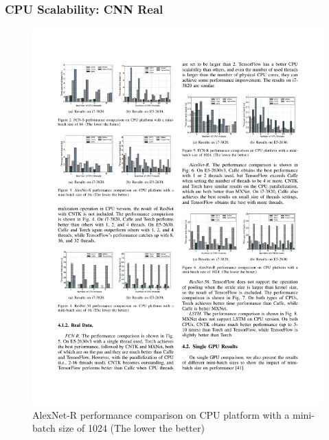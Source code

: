 \begin{frame}
	\MyLogo
	\frametitle{CPU Scalability: CNN Real}  
	\begin{figure}[htbp] 
		\includegraphics[width=\linewidth]{figures/AlexNet-R1.pdf} 
		\caption{AlexNet-R performance comparison on CPU platform with a mini-batch size of 1024 (The lower the better)}
	\end{figure}
\end{frame}


